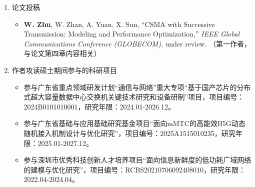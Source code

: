 \begin{enumerate}
	\item 论文投稿
	\begin{itemize}

	\item  \textbf{W. Zhu}, W. Zhan, A. Yuan, X. Sun, ``CSMA with Successive Transmission: Modeling and Performance Optimization,'' \emph{IEEE Global Communications Conference (GLOBECOM)}, under review. （第一作者，与论文第四章内容相关）
	\end{itemize}

	\item 作者攻读硕士期间参与的科研项目
	\begin{itemize}
		\item 参与广东省重点领域研发计划“通信与网络”重大专项“基于国产芯片的分布式超大容量数据中心交换机关键技术研究和设备研制”项目，项目编号：2024B0101010001，研究年限：2024.01-2026.12。

		\item 参与广东省基础与应用基础研究基金项目“面向mMTC的高能效B5G动态随机接入机制设计与优化研究”，项目编号：2025A1515010235，研究年限：2025.01-2027.12。

		\item 参与深圳市优秀科技创新人才培养项目“面向信息新鲜度的低功耗广域网络的建模与优化研究”，项目编号：RCBS20210706092408010，研究年限：2022.04-2024.04。


	\end{itemize}


	
\end{enumerate} 